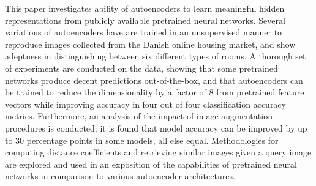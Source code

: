 This paper investigates ability of autoencoders to learn meaningful hidden representations from publicly available pretrained neural networks.
Several variations of autoencoders have are trained in an unsupervised manner to reproduce images collected from the Danish online housing market, and show adeptness in distinguishing between six different types of rooms.
\newline
\newline
A thorough set of experiments are conducted on the data, showing that some pretrained networks produce decent predictions out-of-the-box, and that autoencoders can be trained to reduce the dimensionality by a factor of 8 from pretrained feature vectors while improving accuracy in four out of four classification accuracy metrics.
Furthermore, an analysis of the impact of image augmentation procedures is conducted; it is found that model accuracy can be improved by up to 30 percentage points in some models, all else equal. 
\newline
Methodologies for computing distance coefficients and retrieving similar images given a query image are explored and used in an exposition of the capabilities of pretrained neural networks in comparison to various autoencoder architectures.
\newline




